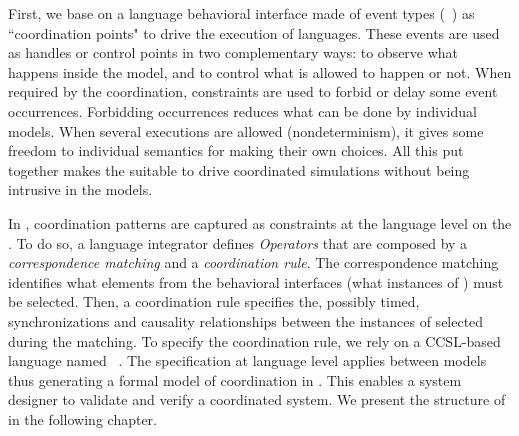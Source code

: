 First, we base on a language behavioral interface made of event types (\ie \dse~\cite{sle13-combemale}) as ``coordination points" to drive the execution of languages. These events are used as handles or control points in two complementary ways: to observe what happens inside the model, and to control what is allowed to happen or not. When required by the coordination, constraints are used to forbid or delay some event occurrences. Forbidding occurrences reduces what can be done by individual models. When several executions are allowed
(nondeterminism), it gives some freedom to individual semantics for making their own choices. All this put together makes the \dse suitable to drive coordinated simulations without being intrusive in the models. 

In \bcool, coordination patterns are captured as constraints at the language level on the \dse. To do so, a language integrator defines \emph{Operators} that are composed by a \emph{correspondence matching} and a \emph{coordination rule}. The correspondence matching identifies what elements from the behavioral interfaces (\ie what instances of \dse) must be selected. Then, a coordination rule specifies the, possibly timed, synchronizations and causality relationships between the instances of \dse selected during the matching. To specify the coordination rule, we rely on a CCSL-based language named \moccml~\cite{moccmlbib}. The specification at language level applies between models thus generating a formal model of coordination in \ccsl. This enables a system designer to validate and verify a coordinated system. We present the structure of \bcool in the following chapter.
